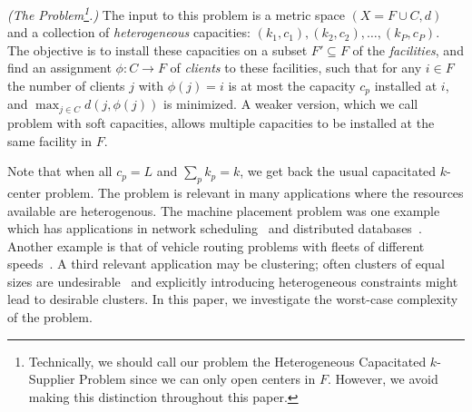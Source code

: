\begin{definition}\emph{(The \mckc Problem\footnote{Technically, we should call our problem the Heterogeneous Capacitated $k$-Supplier Problem since we can only open centers in $F$. However, we avoid making this distinction throughout this paper.}.)}
	The input to this problem is a metric space $(X = F\cup C,d)$  %
	and  a collection of {\em heterogeneous} capacities: $(k_1,c_1), (k_2,c_2),\ldots, (k_P,c_P)$.
	The objective is to install these capacities on a subset $F'\subseteq F$ of the {\em facilities}, and find an assignment $\phi:C\to F$ of {\em clients} to these facilities,
	such that for any $i\in F$ the number of clients $j$ with $\phi(j) = i$ is at most the capacity $c_p$ installed at $i$, and $\max_{j\in C} d(j,\phi(j))$ is minimized.
	A weaker version, which we call \mckc problem with soft capacities, allows multiple capacities to be installed at the same facility in $F$.
\end{definition}
\noindent
Note that when all $c_p = L$ and $\sum_p k_p = k$, we get back the usual capacitated $k$-center problem.
The \mckc problem is relevant in many applications where the resources available are heterogenous. The machine placement problem was one example which has applications in network scheduling~\cite{QiuSZ15,ImM15a} and distributed databases~\cite{MorganL77,SKRN15}. Another example is that of  vehicle routing problems with  fleets of different speeds~\cite{GortzMN016}. A third relevant application may be clustering; often clusters of equal sizes are undesirable~\cite{GuhaRS01} and explicitly introducing heterogeneous constraints might lead to desirable clusters.
In this paper, we investigate the worst-case complexity of the \mckc problem. %

